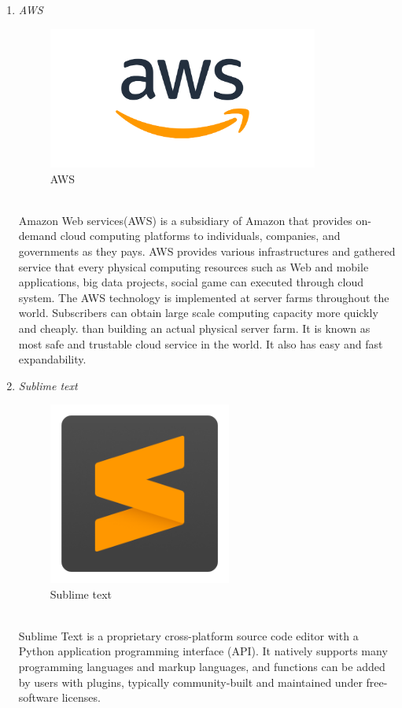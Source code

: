 \documentclass[conference]{IEEEtran}
\begin{document}
\begin{enumerate}
   \item \textit{AWS }
          \begin{figure}[htbp]
    \centerline{\includegraphics[width=89mm, scale=0.5]{fig/aws.png}}
    \caption{AWS}
    \label{fig}
    \end{figure}
   \\Amazon Web services(AWS) is a subsidiary of Amazon that provides on-demand cloud computing platforms to individuals, companies, and governments as they pays. AWS provides various infrastructures and gathered service that every physical computing resources such as Web and mobile applications, big data projects, social game can executed through cloud system. The AWS technology is implemented at server farms throughout the world. Subscribers can obtain large scale computing capacity more quickly and cheaply. than building an actual physical server farm. It is known as most safe and trustable cloud service in the world. It also has easy and fast expandability. \\
   \item \textit{Sublime text } 
             \begin{figure}[htbp]
    \centerline{\includegraphics[width=60mm, scale=0.5]{fig/sublime.png}}
    \caption{Sublime text}
    \label{fig}
    \end{figure}
   \\Sublime Text is a proprietary cross-platform source code editor with a Python application programming interface (API). It natively supports many programming languages and markup languages, and functions can be added by users with plugins, typically community-built and maintained under free-software licenses.\\

\end{enumerate}
\end{document}
